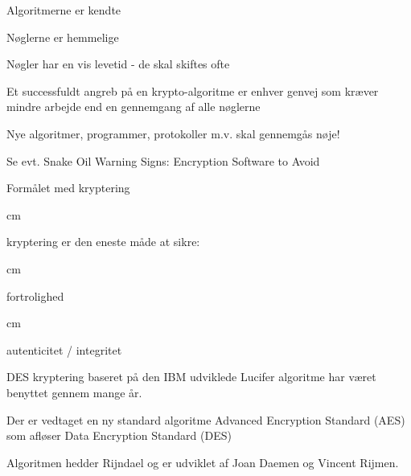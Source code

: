 \documentclass[20pt,landscape,a4paper,footrule]{foils}
\begin{document}

\begin{list1}
\item Algoritmerne er kendte
\item Nøglerne er hemmelige
\item Nøgler har en vis levetid - de skal skiftes ofte
\item Et successfuldt angreb på en krypto-algoritme er enhver genvej
  som kræver mindre arbejde end en gennemgang af alle nøglerne 
\item Nye algoritmer, programmer, protokoller m.v. skal gennemgås nøje!
\item Se evt. Snake Oil Warning Signs:
Encryption Software to Avoid\\ 
\end{list1}


Formålet med kryptering

 cm
\centerline{\hlkbig kryptering er den eneste måde at sikre:}
 cm
\centerline{\hlkbig fortrolighed}
 cm
\centerline{\hlkbig autenticitet / integritet}






\begin{list1}
\item DES kryptering baseret på den IBM udviklede Lucifer algoritme
  har været benyttet gennem mange år. 
\item Der er vedtaget en ny standard algoritme Advanced Encryption
  Standard (AES) som afløser Data Encryption Standard (DES)
\item Algoritmen hedder Rijndael og er udviklet
af Joan Daemen og Vincent Rijmen.

\item 
{}\\
\end{list1}



\end{document}
